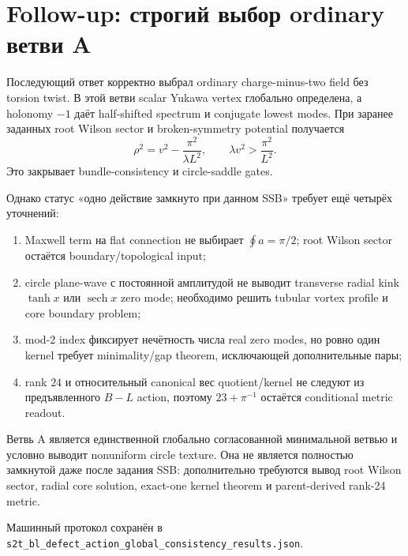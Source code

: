 \section{Follow-up: строгий выбор ordinary ветви A}

Последующий ответ корректно выбрал ordinary charge-minus-two field без
torsion twist. В этой ветви scalar Yukawa vertex глобально определена, а
holonomy \(-1\) даёт half-shifted spectrum и conjugate lowest modes.
При заранее заданных root Wilson sector и broken-symmetry potential
получается
\begin{equation}
 \rho^2=v^2-\frac{\pi^2}{\lambda L^2},
 \qquad
 \lambda v^2>\frac{\pi^2}{L^2}.
\end{equation}
Это закрывает bundle-consistency и circle-saddle gates.

Однако статус «одно действие замкнуто при данном SSB» требует ещё четырёх
уточнений:
\begin{enumerate}
 \item Maxwell term на flat connection не выбирает
 \(\oint a=\pi/2\); root Wilson sector остаётся boundary/topological input;
 \item circle plane-wave с постоянной амплитудой не выводит transverse
 radial kink \(\tanh x\) или \(\operatorname{sech}x\) zero mode; необходимо
 решить tubular vortex profile и core boundary problem;
 \item mod-2 index фиксирует нечётность числа real zero modes, но ровно один
 kernel требует minimality/gap theorem, исключающей дополнительные пары;
 \item rank \(24\) и относительный canonical вес quotient/kernel не следуют
 из предъявленного \(B-L\) action, поэтому \(23+\pi^{-1}\) остаётся
 conditional metric readout.
\end{enumerate}

\begin{remark}
Ветвь A является единственной глобально согласованной минимальной ветвью и
условно выводит nonuniform circle texture. Она не является полностью
замкнутой даже после задания SSB: дополнительно требуются вывод root Wilson
sector, radial core solution, exact-one kernel theorem и parent-derived
rank-24 metric.
\end{remark}

Машинный протокол сохранён в
\texttt{s2t\_bl\_defect\_action\_global\_consistency\_results.json}.